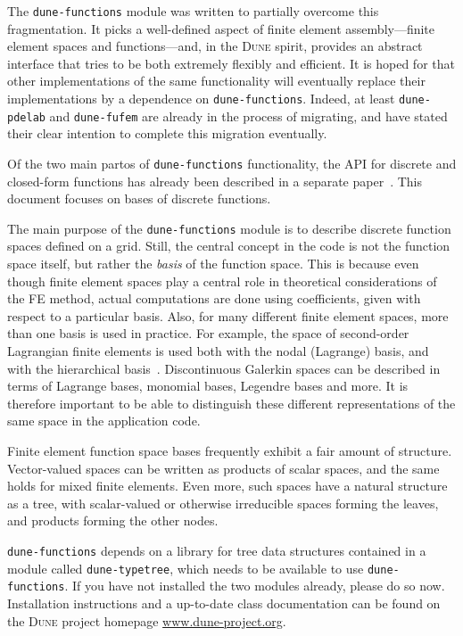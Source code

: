 \documentclass[a4paper,10pt,headings=normal,bibliography=totoc]{scrartcl}
\newcommand{\dune}{\textsc{Dune}\xspace}
\newcommand{\dunemodule}[1]{\texttt{#1}}
\begin{document}
The \dunemodule{dune-functions}  module was written to partially overcome this fragmentation.
It picks a well-defined aspect of finite element assembly---finite element spaces and functions---and,
in the \dune spirit, provides an abstract interface that tries to be both extremely flexibly
and efficient.  It is hoped for that other implementations of the same functionality will
eventually replace their implementations by a dependence on \dunemodule{dune-functions}.
Indeed, at least \dunemodule{dune-pdelab} and \dunemodule{dune-fufem} are already in the process
of migrating, and have stated their clear intention to complete this migration eventually.

Of the two main partos of \dunemodule{dune-functions} functionality, the API for discrete and
closed-form functions has already been described in a separate paper~\cite{engwer_graeser_muething_sander:2015}.
This document focuses on bases of discrete functions.

The main purpose of the \dunemodule{dune-functions} module is to describe discrete function spaces defined on a grid.
Still, the central concept in the code is not the function space itself, but rather the {\em basis} of the function space.
This is because even though finite element spaces play a central role in theoretical considerations of the FE method,
actual computations are done using coefficients, given with respect to a particular basis.  Also,
for many different finite element spaces, more than one basis is used in practice.  For example,
the space of second-order Lagrangian finite elements is used both with the nodal (Lagrange) basis, and with the
hierarchical basis~\cite{bank:1996}.  Discontinuous Galerkin spaces can be described in terms of Lagrange bases,
monomial bases, Legendre bases and more.  It is therefore important to be able to distinguish these different
representations of the same space in the application code.

Finite element function space bases frequently exhibit a fair amount of structure.  Vector-valued spaces can be
written as products of scalar spaces, and the same holds for mixed finite elements.  Even more, such spaces
have a natural structure as a tree, with scalar-valued or otherwise irreducible spaces forming the leaves, and
products forming the other nodes.

\dunemodule{dune-functions} depends on a library for tree data structures contained in a module
called \dunemodule{dune-typetree}, which needs to be available to use \dunemodule{dune-functions}.
If you have not installed the two modules already, please do so now.
Installation instructions and a up-to-date class documentation can be found on the \dune
project homepage \url{www.dune-project.org}.
\end{document}
